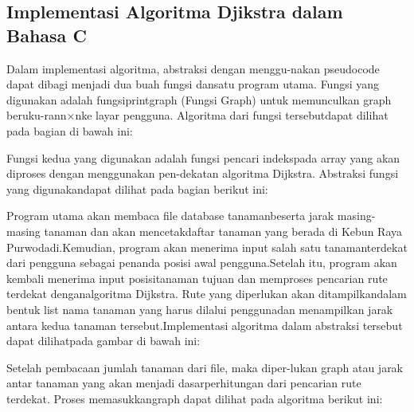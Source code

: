 \documentclass[conference]{IEEEtran}
\begin{document}
\subsection{Implementasi Algoritma Djikstra dalam Bahasa C}
Dalam  implementasi  algoritma,  abstraksi  dengan  menggu-nakan pseudocode dapat dibagi menjadi dua buah fungsi dansatu  program  utama.  Fungsi  yang  digunakan  adalah  fungsiprintgraph (Fungsi Graph) untuk memunculkan graph beruku-rann×nke  layar  pengguna.  Algoritma  dari  fungsi  tersebutdapat dilihat pada bagian di bawah ini:

\begin{figure}[htbp]
	\centering
	\resizebox{0.5\textwidth}{!}{}
\end{figure}

Fungsi kedua yang digunakan adalah fungsi pencari indekspada  array  yang  akan  diproses  dengan  menggunakan  pen-dekatan  algoritma  Dijkstra.  Abstraksi  fungsi  yang  digunakandapat dilihat pada bagian berikut ini:

\begin{figure}[htbp]
	\centering
	\resizebox{0.5\textwidth}{!}{}
\end{figure}

Program   utama   akan   membaca   file   database   tanamanbeserta  jarak  masing-masing  tanaman  dan  akan  mencetakdaftar   tanaman   yang   berada   di   Kebun   Raya   Purwodadi.Kemudian, program akan menerima input salah satu tanamanterdekat dari pengguna sebagai penanda posisi awal pengguna.Setelah  itu,  program  akan  kembali  menerima  input  posisitanaman tujuan dan memproses pencarian rute terdekat denganalgoritma  Dijkstra.  Rute  yang  diperlukan  akan  ditampilkandalam bentuk list nama tanaman yang harus dilalui penggunadan   menampilkan   jarak   antara   kedua   tanaman   tersebut.Implementasi algoritma dalam abstraksi tersebut dapat dilihatpada gambar di bawah ini:

\begin{figure}[htbp]
	\centering
	\resizebox{0.5\textwidth}{!}{}
\end{figure}
 
Setelah  pembacaan  jumlah  tanaman  dari  file,  maka  diper-lukan graph atau jarak antar tanaman yang akan menjadi dasarperhitungan dari pencarian rute terdekat. Proses memasukkangraph dapat dilihat pada algoritma berikut ini:

\begin{figure}[htbp]
	\centering
	\resizebox{0.5\textwidth}{!}{}
\end{figure}
\end{document}
